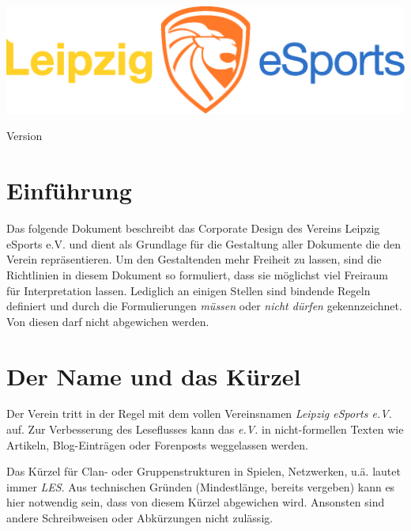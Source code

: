 \documentclass{article}
\begin{document}
\begin{titlepage}
\vspace*{\fill}
\title{\titel}
\author{\autor}
\includegraphics[width=\textwidth]{Docs/Logo.eps}
{\let\newpage\relax\maketitle}
\begin{center}
Version \version
\end{center}
\vspace*{\fill}
\end{titlepage}

\cleardoublepage

\tableofcontents

\cleardoublepage
\section{Einführung}

Das folgende Dokument beschreibt das Corporate Design des Vereins Leipzig eSports e.V. und dient als Grundlage für die Gestaltung aller Dokumente die den Verein repräsentieren.
Um den Gestaltenden mehr Freiheit zu lassen, sind die Richtlinien in diesem Dokument so formuliert, dass sie möglichst viel Freiraum für Interpretation lassen.
Lediglich an einigen Stellen sind bindende Regeln definiert und durch die Formulierungen \emph{müssen} oder \emph{nicht dürfen} gekennzeichnet.
Von diesen darf nicht abgewichen werden.

\cleardoublepage
\section{Der Name und das Kürzel}

Der Verein tritt in der Regel mit dem vollen Vereinsnamen \emph{Leipzig eSports e.V.} auf.
Zur Verbesserung des Leseflusses kann das \emph{e.V.} in nicht-formellen Texten wie Artikeln, Blog-Einträgen oder Forenposts weggelassen werden.

Das Kürzel für Clan- oder Gruppenstrukturen in Spielen, Netzwerken, u.ä. lautet immer \emph{LES}.
Aus technischen Gründen (Mindestlänge, bereits vergeben) kann es hier notwendig sein, dass von diesem Kürzel abgewichen wird.
Ansonsten sind andere Schreibweisen oder Abkürzungen nicht zulässig.
\end{document}
